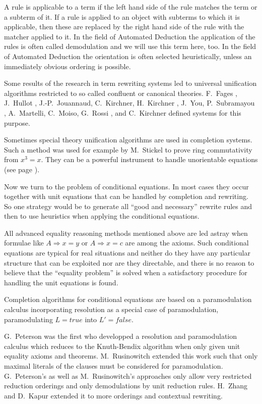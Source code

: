 A rule is applicable to a term if the left hand side of the rule
matches the term or a subterm of it. If a rule is applied to an object
with subterms to which it is applicable, then these are replaced by
the right hand side of the rule with the matcher applied to it. In the
field of Automated Deduction the application of the rules is often
called demodulation \cite{WoRoCaSh67,WoOvLuBo84} and we will use this
term here, too. In the field of Automated Deduction the orientation is
often selected heuristically, unless an immediately obvious ordering
is possible.

Some results of the research in term rewriting systems led to
universal unification algorithms restricted to so called confluent or
canonical theories.  F.\ Fages \cite{Fages83}, J.\ Hullot
\cite{Hullot80}, J.-P.\ Jouannaud, C.\ Kirchner, H.\ Kirchner
\cite{JoKiKi83}, J.\ You, P.\ Subramayou \cite{YoSu86}, A.\ Martelli, 
C.\ Moiso, G.\ Rossi \cite{MaMoRo86}, and C.\ Kirchner
\cite{Kirchner85} defined systems for this purpose.

Sometimes special theory unification algorithms are used in completion
systems.  Such a method was used for example by M.\ Stickel
\cite{Stickel85} to prove ring commutativity from $x^3=x$. They can be
a powerful instrument to handle unorientable equations (see page
\pageref{Attributes}).

Now we turn to the problem of conditional equations. In most cases they
occur together with unit equations that can be handled by completion and
rewriting. So one strategy would be to generate all ``good and necessary''
rewrite rules and then to use heuristics when applying the conditional
equations.

All advanced equality 
reasoning methods mentioned above are led
astray when formulae like $A \Rightarrow x=y$ or $A \Rightarrow x=c$
are among the axioms. Such conditional equations are typical for real
situations and neither do they
have any particular structure that can be exploited 
nor are they directable, and there is no reason to 
believe that the ``equality problem'' is solved 
when a satisfactory procedure for handling the unit equations is 
found. 

Completion algorithms for conditional equations are based on a
para\-mo\-du\-la\-tion calculus incorporating resolution as a special case of
paramodulation, paramodulating $L=true$ into $L'=false$.

G.\ Peterson \cite{Peterson83} was the first who developped a
resolution and pa\-ra\-mo\-du\-la\-tion calculus which reduces to the
Knuth-Bendix algorithm when only given unit equality axioms and
theorems. M.\ Rusinowitch
\cite{HsRu86,Rusinowitch87} extended this work such that only maximal
\nopagebreak[4]
literals of the clauses must be considered for paramodulation. G.\
Peterson's as well as M.\ Rusinowitch's approaches only allow very
restricted reduction orderings and only demodulations by unit reduction
rules.
H.\ Zhang and D.\ Kapur \cite{ZhKa88} extended it to more orderings and
contextual rewriting. 

